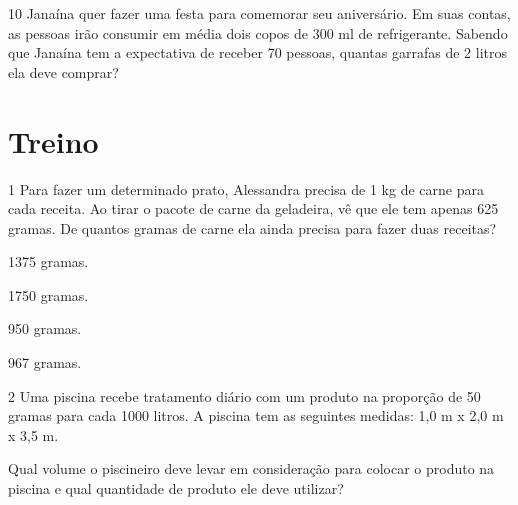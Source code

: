 \begin{emptybox}

\end{emptybox}

\num{10} Janaína quer fazer uma festa para comemorar seu aniversário. Em suas
contas, as pessoas irão consumir em média dois copos de 300 ml de refrigerante.
Sabendo que Janaína tem a expectativa de receber 70 pessoas, quantas garrafas de
2 litros ela deve comprar?

\begin{emptybox}
\end{emptybox}

\section{Treino}

\num{1} Para fazer um determinado prato, Alessandra precisa de 1 kg de carne
para cada receita. Ao tirar o pacote de carne da geladeira, vê que ele
tem apenas 625 gramas. De quantos gramas de carne ela ainda precisa para
fazer duas receitas?

\begin{escolha}

  \item 1375 gramas.

  \item 1750 gramas.

  \item 950 gramas.

  \item 967 gramas.

\end{escolha}

\num{2} Uma piscina recebe tratamento diário com um produto na proporção de
50 gramas para cada 1000 litros. A piscina tem as seguintes medidas:
1,0 m x 2,0 m x 3,5 m. 

Qual volume o piscineiro deve levar em
consideração para colocar o produto na piscina e qual quantidade de
produto ele deve utilizar?

